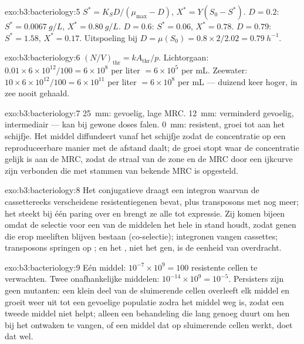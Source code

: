 \begin{solution}{exo:b3:bacteriology:5}
$S^{*} = K_{S}D/(\mu_{\max} - D)$, $X^{*} = Y(S_{0} - S^{*})$. $D = 0.2$:
$S^{*} = \qty{0.0067}{g/L}$, $X^{*} = \qty{0.80}{g/L}$. $D = 0.6$:
$S^{*} = 0.06$, $X^{*} = 0.78$. $D = 0.79$: $S^{*} = 1.58$, $X^{*} = 0.17$.
Uitspoeling bij $D = \mu(S_{0}) = 0.8\times 2/2.02 = \qty{0.79}{h^{-1}}$.
\end{solution}

\begin{solution}{exo:b3:bacteriology:6}
$(N/V)_{\text{thr}} = kA_{\text{thr}}/p$. Lichtorgaan: $0.01\times
6\times 10^{12}/100 = 6\times 10^{8}$ per liter $= 6\times 10^{5}$ per
mL. Zeewater: $10\times 6\times 10^{12}/100 = 6\times 10^{11}$ per liter
$= 6\times 10^{8}$ per mL --- duizend keer hoger, in zee nooit
gehaald.
\end{solution}

\begin{solution}{exo:b3:bacteriology:7}
\qty{25}{mm}: gevoelig, lage MRC. \qty{12}{mm}: verminderd gevoelig,
intermediair --- kan bij gewone doses falen. \qty{0}{mm}: resistent,
groei tot aan het schijfje. Het middel diffundeert vanaf het schijfje
zodat de concentratie op een reproduceerbare manier met de afstand
daalt; de groei stopt waar de concentratie gelijk is aan de MRC, zodat
de straal van de zone en de MRC door een ijkcurve zijn verbonden die
met stammen van bekende MRC is opgesteld.
\end{solution}

\begin{solution}{exo:b3:bacteriology:8}
Het conjugatieve  draagt een integron waarvan de cassettereeks
verscheidene resistentiegenen bevat, plus transposons met nog meer; het
 steekt bij één paring over en brengt ze alle tot expressie.
Zij komen bijeen omdat de selectie voor een van de middelen het hele
 in stand houdt, zodat genen die erop meeliften blijven bestaan
(co-selectie); integronen vangen cassettes; transposons springen op
; en het , niet het gen, is de eenheid van overdracht.
\end{solution}

\begin{solution}{exo:b3:bacteriology:9}
Eén middel: $10^{-7}\times 10^{9} = 100$ resistente cellen te
verwachten. Twee onafhankelijke middelen: $10^{-14}\times 10^{9} = 10^{-5}$.
Persisters zijn geen mutanten: een klein deel van de sluimerende cellen
overleeft elk middel en groeit weer uit tot een gevoelige populatie
zodra het middel weg is, zodat een tweede middel niet helpt; alleen een
behandeling die lang genoeg duurt om hen bij het ontwaken te vangen, of
een middel dat op sluimerende cellen werkt, doet dat wel.
\end{solution}

